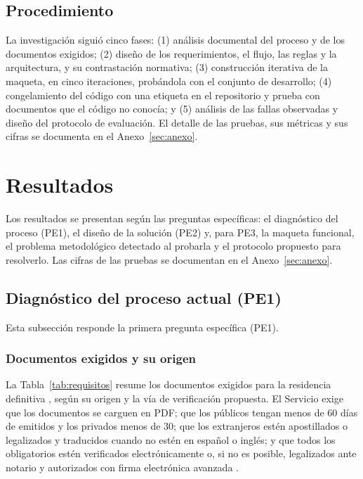 \documentclass[11pt,a4paper]{article}
\begin{document}
\subsection{Procedimiento}
La investigación siguió cinco fases: (1) análisis documental del proceso y de los documentos exigidos; (2) diseño de los requerimientos, el flujo, las reglas y la arquitectura, y su contrastación normativa; (3) construcción iterativa de la maqueta, en cinco iteraciones, probándola con el conjunto de desarrollo; (4) congelamiento del código con una etiqueta en el repositorio y prueba con documentos que el código no conocía; y (5) análisis de las fallas observadas y diseño del protocolo de evaluación. El detalle de las pruebas, sus métricas y sus cifras se documenta en el Anexo~\ref{sec:anexo}.

\section{Resultados}
\label{sec:res}
Los resultados se presentan según las preguntas específicas: el diagnóstico del proceso (PE1), el diseño de la solución (PE2) y, para PE3, la maqueta funcional, el problema metodológico detectado al probarla y el protocolo propuesto para resolverlo. Las cifras de las pruebas se documentan en el Anexo~\ref{sec:anexo}.

\subsection{Diagnóstico del proceso actual (PE1)}
\label{sec:diagnostico}
Esta subsección responde la primera pregunta específica (PE1).

\subsubsection{Documentos exigidos y su origen}
La Tabla~\ref{tab:requisitos} resume los documentos exigidos para la residencia definitiva \cite{sermigrd}, según su origen y la vía de verificación propuesta. El Servicio exige que los documentos se carguen en PDF; que los públicos tengan menos de 60 días de emitidos y los privados menos de 30; que los extranjeros estén apostillados o legalizados y traducidos cuando no estén en español o inglés; y que todos los obligatorios estén verificados electrónicamente o, si no es posible, legalizados ante notario y autorizados con firma electrónica avanzada \cite{sermigrd}.
\end{document}
